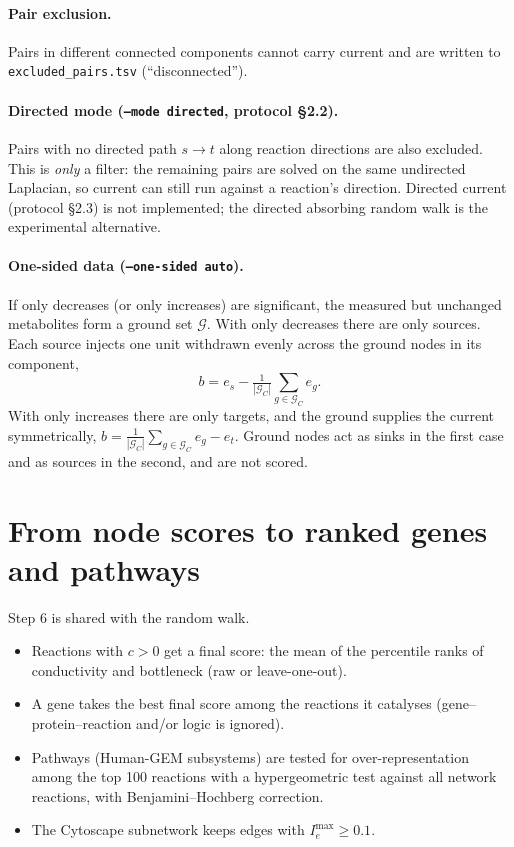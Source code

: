\documentclass[11pt]{article}
\newcommand{\code}[1]{\texttt{#1}}
\begin{document}
\paragraph{Pair exclusion.} Pairs in different connected components cannot carry
current and are written to \code{excluded\_pairs.tsv} (``disconnected'').

\paragraph{Directed mode (\code{--mode directed}, protocol \S2.2).} Pairs with no
directed path $s\to t$ along reaction directions are also excluded. This is
\emph{only} a filter: the remaining pairs are solved on the same undirected
Laplacian, so current can still run against a reaction's direction. Directed
current (protocol \S2.3) is not implemented; the directed absorbing random walk is
the experimental alternative.

\paragraph{One-sided data (\code{--one-sided auto}).} If only decreases (or only
increases) are significant, the measured but unchanged metabolites form a ground set
$\mathcal G$. With only decreases there are only sources. Each source injects one
unit withdrawn evenly across the ground nodes in its component,
\[
  b = e_s - \tfrac{1}{|\mathcal G_C|}\textstyle\sum_{g\in\mathcal G_C} e_g .
\]
With only increases there are only targets, and the ground supplies the current
symmetrically, $b = \tfrac{1}{|\mathcal G_C|}\sum_{g\in\mathcal G_C} e_g - e_t$.
Ground nodes act as sinks in the first case and as sources in the second, and are
not scored.

\section{From node scores to ranked genes and pathways}
Step 6 is shared with the random walk.
\begin{itemize}[nosep]
  \item Reactions with $c>0$ get a final score: the mean of the percentile ranks of
        conductivity and bottleneck (raw or leave-one-out).
  \item A gene takes the best final score among the reactions it catalyses
        (gene--protein--reaction and/or logic is ignored).
  \item Pathways (Human-GEM subsystems) are tested for over-representation among the
        top 100 reactions with a hypergeometric test against all network reactions,
        with Benjamini--Hochberg correction.
  \item The Cytoscape subnetwork keeps edges with $I^{\max}_e\ge 0.1$.
\end{itemize}
\end{document}
